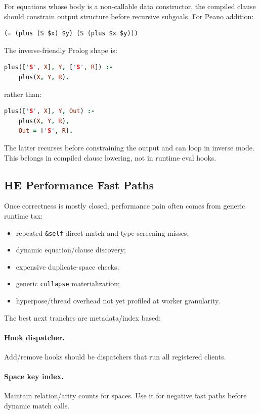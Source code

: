 \documentclass[11pt]{article}
\begin{document}
For equations whose body is a non-callable data constructor, the compiled clause should constrain output structure before recursive subgoals.  For Peano addition:

\begin{lstlisting}
(= (plus (S $x) $y) (S (plus $x $y)))
\end{lstlisting}

The inverse-friendly Prolog shape is:

\begin{lstlisting}[language=Prolog]
plus(['S', X], Y, ['S', R]) :-
    plus(X, Y, R).
\end{lstlisting}

rather than:

\begin{lstlisting}[language=Prolog]
plus(['S', X], Y, Out) :-
    plus(X, Y, R),
    Out = ['S', R].
\end{lstlisting}

The latter recurses before constraining the output and can loop in inverse mode.  This belongs in compiled clause lowering, not in runtime eval hooks.

\subsection{HE Performance Fast Paths}

Once correctness is mostly closed, performance pain often comes from generic runtime tax:

\begin{itemize}[leftmargin=*]
  \item repeated \texttt{\&self} direct-match and type-screening misses;
  \item dynamic equation/clause discovery;
  \item expensive duplicate-space checks;
  \item generic \texttt{collapse} materialization;
  \item hyperpose/thread overhead not yet profiled at worker granularity.
\end{itemize}

The best next tranches are metadata/index based:

\paragraph{Hook dispatcher.}  Add/remove hooks should be dispatchers that run all registered clients.

\paragraph{Space key index.}  Maintain relation/arity counts for spaces.  Use it for negative fast paths before dynamic match calls.
\end{document}
